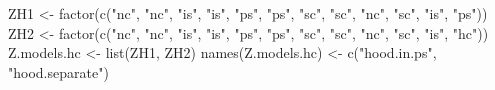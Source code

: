 \begin{Schunk}
\begin{Sinput}
 ZH1 <- factor(c("nc", "nc", "is", "is", "ps",
   "ps", "sc", "sc", "nc", "sc", "is", "ps"))
 ZH2 <- factor(c("nc", "nc", "is", "is", "ps",
   "ps", "sc", "sc", "nc", "sc", "is", "hc"))
 Z.models.hc <- list(ZH1, ZH2)
 names(Z.models.hc) <- c("hood.in.ps", "hood.separate")
\end{Sinput}
\end{Schunk}
